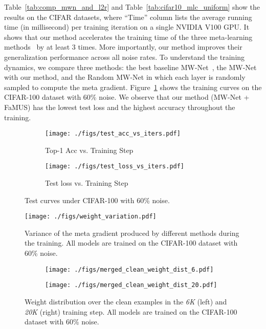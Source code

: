 \documentclass[final]{cvpr}
\begin{document}
Table~\ref{tab:comp_mwn_and_l2r} and Table~\ref{tab:cifar10_mlc_uniform} show the results on the CIFAR datasets, where ``Time'' column lists the average running time (in millisecond) per training iteration on a single NVIDIA V100 GPU. It shows that our method accelerates the training time of the three meta-learning methods~\cite{ren2018learning, shu2019meta, wang2020training} by at least 3 times. More importantly, our method improves their generalization performance across all noise rates. To understand the training dynamics, we compare three methods: the best baseline MW-Net~\cite{shu2019meta}, the MW-Net with our method, and the Random MW-Net in which each layer is randomly sampled to compute the meta gradient.
Figure~\ref{fig:test_acc} shows the training curves on the CIFAR-100 dataset with 60\% noise. We observe that our method (MW-Net + FaMUS) has the lowest test loss and the highest accuracy throughout the training.


\begin{figure}[t]
\begin{subfigure}{.23\textwidth}
\texttt{[image: ./figs/test\_acc\_vs\_iters.pdf]}
\footnotesize\caption{Top-1 Acc vs. Training Step}
\end{subfigure}
\begin{subfigure}{.23\textwidth}
\texttt{[image: ./figs/test\_loss\_vs\_iters.pdf]}
\footnotesize\caption{Test loss vs. Training Step}
\end{subfigure}
\vspace{-2mm}
\caption{Test curves under CIFAR-100 with 60\% noise.}
\label{fig:test_acc}
\end{figure}

\begin{figure}[t]
\centering
\texttt{[image: ./figs/weight\_variation.pdf]}
\vspace{-2mm}
\caption{Variance of the meta gradient produced by different methods during the training. All models are trained on the CIFAR-100 dataset with 60\% noise.}
\label{fig:weight_variation}
\end{figure}


\begin{figure}[t]
\centering
\begin{subfigure}{.23\textwidth}
\texttt{[image: ./figs/merged\_clean\_weight\_dist\_6.pdf]}
\end{subfigure}
\begin{subfigure}{.23\textwidth}
\texttt{[image: ./figs/merged\_clean\_weight\_dist\_20.pdf]}
\end{subfigure}
\vspace{-2mm}
\caption{Weight distribution over the clean examples in the \textit{6K} (left) and \textit{20K} (right) training step. All models are trained on the CIFAR-100 dataset with 60\% noise.}
\label{fig:weight_distutions}
\vspace{-6mm}
\end{figure}
\end{document}
